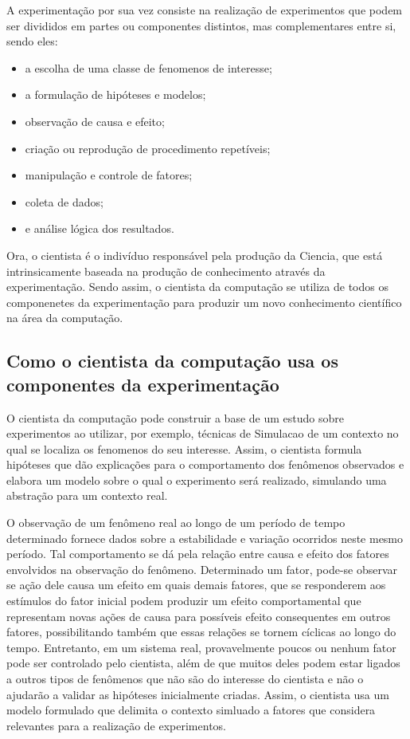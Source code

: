 A experimentação por sua vez consiste na realização de experimentos que podem ser divididos em partes ou componentes distintos, mas complementares entre si, sendo eles:

\begin{itemize}
\item a escolha de uma classe de \gls{fenomeno}s de interesse;
\item a formulação de hipóteses e modelos;
\item observação de causa e efeito;
\item criação ou reprodução de procedimento repetíveis;
\item manipulação e controle de fatores;
\item coleta de dados;
\item e análise lógica dos resultados.
\end{itemize}

Ora, o cientista é o indivíduo responsável pela produção da \gls{Ciencia}, que está intrinsicamente baseada na produção de conhecimento através da experimentação. Sendo assim, o cientista da computação se utiliza de todos os componenetes da experimentação para produzir um novo conhecimento científico na área da computação.

\subsection{Como o cientista da computação usa os componentes da experimentação}

O cientista da computação pode construir a base de um estudo sobre experimentos ao utilizar, por exemplo, técnicas de \gls{Simulacao} de um contexto no qual se localiza os fenomenos do seu interesse. Assim, o cientista formula hipóteses que dão explicações para o comportamento dos fenômenos observados e elabora um modelo sobre o qual o experimento será realizado, simulando uma abstração para um contexto real.

O observação de um fenômeno real ao longo de um período de tempo determinado fornece dados sobre a estabilidade e variação ocorridos neste mesmo período. Tal comportamento se dá pela relação entre causa e efeito dos fatores envolvidos na observação do fenômeno. Determinado um fator, pode-se observar se ação dele causa um efeito em quais demais fatores, que se responderem aos estímulos do fator inicial podem produzir um efeito comportamental que representam novas ações de causa para possíveis efeito consequentes em outros fatores, possibilitando também que essas relações se tornem cíclicas ao longo do tempo. Entretanto, em um sistema real, provavelmente poucos ou nenhum fator pode ser controlado pelo cientista, além de que muitos deles podem estar ligados a outros tipos de fenômenos que não são do interesse do cientista e não o ajudarão a validar as hipóteses inicialmente criadas. Assim, o cientista usa um modelo formulado que delimita o contexto simluado a fatores que considera relevantes para a realização de experimentos.

